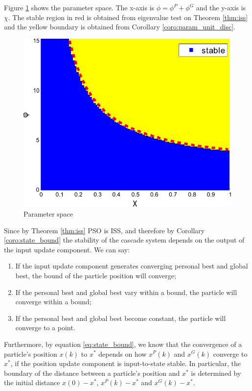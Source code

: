 Figure \ref{fig:paramSpace} shows the parameter space.
The x-axis is $ \phi = \phi^{P} + \phi^{G} $ and the y-axis is $ \chi $.
The stable region in red is obtained from eigenvalue test on Theorem \ref{thm:iss} and the yellow boundary is obtained from Corollary \ref{coro:param_unit_disc}.
\begin{figure}
\centering
\includegraphics[width=0.5\linewidth]{./fig/param2}
\caption{Parameter space}
\label{fig:paramSpace}
\end{figure}

Since by Theorem \ref{thm:iss} PSO is ISS, and therefore by Corollary \ref{coro:state_bound} the stability of the cascade system depends on the output of the input update component. We can say:
\begin{enumerate}
\item If the input update component generates converging personal best and global best, the bound of the particle position will converge;
\item If the personal best and global best vary within a bound, the particle will converge within a bound;
\item If the personal best and global best become constant, the particle will converge to a point.
\end{enumerate}
Furthermore, by equation \eqref{eq:state_bound}, we know that the convergence of a particle's position $ x(k) $ to $ x^{*} $ depends on how $ x^{P}(k) $ and $ x^{G}(k) $ converge to $ x^{*} $, if the position update component is input-to-state stable.
In particular, the boundary of the distance between a particle's position and  $ x^{*} $ is determined by the initial distance $ x(0) -  x^{*} $, $ x^{P}(k) -  x^{*} $ and $ x^{G}(k) -  x^{*} $.

